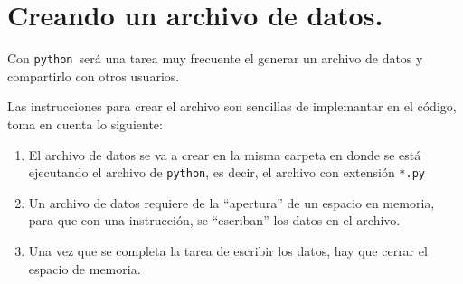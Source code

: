 \documentclass[12pt]{article}
\newcommand{\python}{\texttt{python}}
\begin{document}
\section{Creando un archivo de datos.}
Con \python\ será una tarea muy frecuente el generar un archivo de datos y compartirlo con otros usuarios.
\par
Las instrucciones para crear el archivo son sencillas de implemantar en el código, toma en cuenta lo siguiente:
\begin{enumerate}
\item El archivo de datos se va a crear en la misma carpeta en donde se está ejecutando el archivo de \python, es decir, el archivo con extensión \texttt{*.py}
\item Un archivo de datos requiere de la \enquote{apertura} de un espacio en memoria, para que con una instrucción, se \enquote{escriban} los datos en el archivo.
\item Una vez que se completa la tarea de escribir los datos, hay que cerrar el espacio de memoria.
\end{enumerate}
\end{document}
